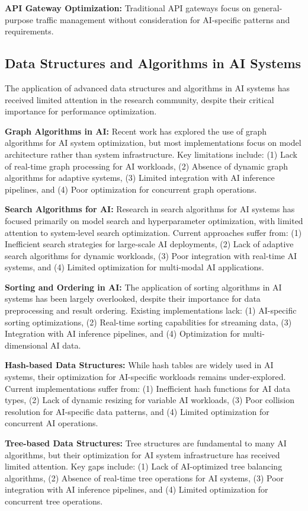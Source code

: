 \documentclass[conference]{IEEEtran}
\begin{document}
\textbf{API Gateway Optimization:} Traditional API gateways focus on general-purpose traffic management without consideration for AI-specific patterns and requirements.

\subsection{Data Structures and Algorithms in AI Systems}
The application of advanced data structures and algorithms in AI systems has received limited attention in the research community, despite their critical importance for performance optimization.

\textbf{Graph Algorithms in AI:} Recent work has explored the use of graph algorithms for AI system optimization, but most implementations focus on model architecture rather than system infrastructure. Key limitations include: (1) Lack of real-time graph processing for AI workloads, (2) Absence of dynamic graph algorithms for adaptive systems, (3) Limited integration with AI inference pipelines, and (4) Poor optimization for concurrent graph operations.

\textbf{Search Algorithms for AI:} Research in search algorithms for AI systems has focused primarily on model search and hyperparameter optimization, with limited attention to system-level search optimization. Current approaches suffer from: (1) Inefficient search strategies for large-scale AI deployments, (2) Lack of adaptive search algorithms for dynamic workloads, (3) Poor integration with real-time AI systems, and (4) Limited optimization for multi-modal AI applications.

\textbf{Sorting and Ordering in AI:} The application of sorting algorithms in AI systems has been largely overlooked, despite their importance for data preprocessing and result ordering. Existing implementations lack: (1) AI-specific sorting optimizations, (2) Real-time sorting capabilities for streaming data, (3) Integration with AI inference pipelines, and (4) Optimization for multi-dimensional AI data.

\textbf{Hash-based Data Structures:} While hash tables are widely used in AI systems, their optimization for AI-specific workloads remains under-explored. Current implementations suffer from: (1) Inefficient hash functions for AI data types, (2) Lack of dynamic resizing for variable AI workloads, (3) Poor collision resolution for AI-specific data patterns, and (4) Limited optimization for concurrent AI operations.

\textbf{Tree-based Data Structures:} Tree structures are fundamental to many AI algorithms, but their optimization for AI system infrastructure has received limited attention. Key gaps include: (1) Lack of AI-optimized tree balancing algorithms, (2) Absence of real-time tree operations for AI systems, (3) Poor integration with AI inference pipelines, and (4) Limited optimization for concurrent tree operations.
\end{document}
